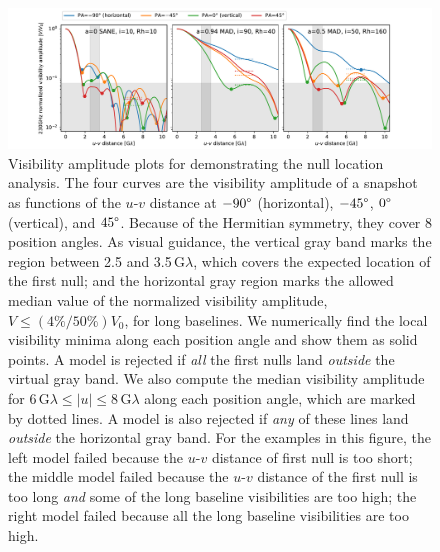 \begin{figure}
  \centering
  \includegraphics[width=\columnwidth]{figures/sample_va.pdf}
  \caption{
    Visibility amplitude plots for demonstrating the null
    location analysis.
    The four curves are the visibility amplitude of a snapshot as
    functions of the $u$-$v$ distance at $-90\degree$ (horizontal),
    $-45\degree$, $0\degree$ (vertical), and $45\degree$.
    Because of the Hermitian symmetry, they cover 8 position angles.
    As visual guidance, the vertical gray band marks the region
    between 2.5 and 3.5\,$\mathrm{G}\lambda$, which covers the
    expected location of the first null; and the horizontal gray region
    marks the allowed median value of the normalized visibility
    amplitude, $V \leq (4\%/50\%) V_0$, for long baselines.
    We numerically find the local visibility minima along each
    position angle and show them as solid points.
    A model is rejected if \emph{all} the first nulls land
    \emph{outside} the virtual gray band.
    We also compute the median visibility amplitude for
    $6\,\mathrm{G}\lambda \leq |u| \leq 8\,\mathrm{G}\lambda$ along
    each position angle, which are marked by dotted lines.
    A model is also rejected if \emph{any} of these lines land
    \emph{outside} the horizontal gray band.
    For the examples in this figure, the left model failed because the
    $u$-$v$ distance of first null is too short; the middle model failed
    because the $u$-$v$ distance of the first null is too long
    \emph{and} some of the long baseline visibilities are too high;
    the right model failed because all the long baseline visibilities
    are too high.
    }
  \label{fig:passfail_va}
\end{figure}


